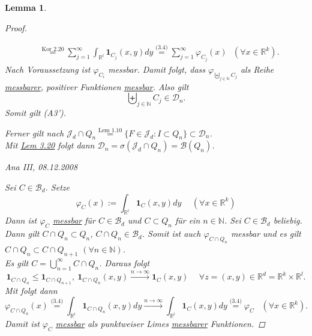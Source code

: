 \documentclass[a4paper]{report}
\newcommand{\doubleOne}{\textbf{1}}
\newcommand{\R}{\mathbb{R}}
\newcommand{\N}{\mathbb{N}}
\newcommand{\Borel}{\mathcal{B}}
\newcommand{\Bd}{\Borel_d}
\newcommand{\Jd}{\mathcal{J}_d}
\newcommand{\bigdcup}{\biguplus}
\newcommand{\jlabel}[1]{\label{j_#1}}
\newcommand{\jshortlink}[1]{\jhyperref{#1}{\text{#1}}}
\newcommand{\jhyperref}[2]{\hyperref[j_#1]{#2}}
\newcommand{\jlink}[1]{\jhyperref{#1}{#1}}
\newcommand{\BeppoLevi}{\text{\jhyperref{Thm 2.19}{Beppo Levi}}}
\newcommand{\jspacesmall}{\vspace{4pt}}
\newcommand{\jdate}[1]{\jspacesmall\begin{center}\jlabel{#1}\tiny{Ana III, #1}\end{center}}
\theoremstyle{plain}
\newtheorem{lem}[thm]{Lemma}
\theoremstyle{definition}
\begin{document}
{{{{\begin{lem}
\begin{proof}
\begin{itemize}
\begin{displaymath}
\begin{split}
                        &\overset{\jshortlink{Kor 2.20}}{=} \sum_{j=1}^\infty \int_{\R^l} \doubleOne_{C_j}(x,y) dy \overset{\jshortlink{(3.4)}}{=} \sum_{j=1}^\infty \varphi_{C_j}(x) \ \ \ (\forall x\in \R^k).
                    \end{split}
                \end{displaymath}
                Nach Voraussetzung ist $\varphi_{C_i}$ messbar. Damit folgt, dass $\varphi_{\bigdcup_{j\in\N} C_j}$ als Reihe \hyperref[j_messbar]{messbarer}, positiver Funktionen \jlink{messbar}. Also gilt
                \begin{displaymath}
                    \bigdcup_{j\in\N} C_j \in \mathcal{D}_n.
                \end{displaymath}
                Somit gilt (A3').
        \end{itemize}
        Ferner gilt nach $\Jd \cap Q_n \overset{\jshortlink{Lem 1.10}}{=} \{F \in \Jd : I \subset Q_n\} \subset \mathcal{D}_n$.\\
        Mit \jlink{Lem 3.20} folgt dann $\mathcal{D}_n = \sigma(\Jd\cap Q_n) = \Borel(Q_n)$.
        
\jdate{08.12.2008}

        Sei $C\in \Bd$. Setze
        \begin{displaymath}
            \varphi_C(x) := \int_{\R^l} \doubleOne_C(x,y)dy \hspace{15pt} (\forall x\in\R^k)
        \end{displaymath}
        Dann ist $\varphi_C$ \jlink{messbar} für $C\in \Bd$ und $C \subset Q_n$ für ein $n\in\N$. Sei $C\in \Bd$ beliebig. Dann gilt $C\cap Q_n \subset Q_n$, $C\cap Q_n \in \Bd$. Somit ist auch $\varphi_{C\cap Q_n}$ messbar und es gilt $C\cap Q_n\subset C\cap Q_{n+1}$ $(\forall n\in\N)$.\\
        Es gilt $C = \bigcup_{n=1}^\infty C\cap Q_n$. Daraus folgt
        \begin{displaymath}
            \doubleOne_{C\cap Q_n} \le \doubleOne_{C\cap Q_{n+1}}, \ \doubleOne_{C \cap Q_n} (x,y) \xrightarrow{n\rightarrow\infty} \doubleOne_C (x,y) \hspace{15pt} \forall z=(x,y)\in\R^d = \R^k\times \R^l.
        \end{displaymath}
        Mit \BeppoLevi{} folgt dann
        \begin{displaymath}
            \varphi_{C\cap Q_n}(x) \overset{\jshortlink{(3.4)}}{=} \int_{\R^l} \doubleOne_{C\cap Q_n} (x,y)dy \xrightarrow{n\rightarrow\infty} \int_{\R^l} \doubleOne_C (x,y) dy \overset{\jshortlink{(3.4)}}{=} \varphi_C \hspace{10pt} (\forall x\in \R^k).
        \end{displaymath}
        Damit ist $\varphi_C$ \jlink{messbar} als punktweiser Limes \jhyperref{messbar}{messbarer} Funktionen.
    \end{proof}
\end{lem}

}}}}
\end{document}
